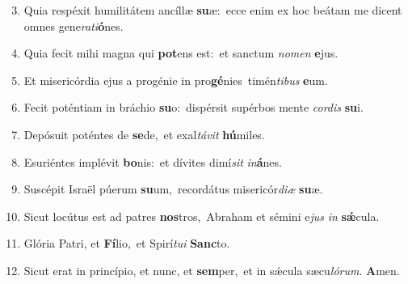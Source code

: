 \begin{enumerate}
    \setcounter{enumi}{2}

    \item Quia respéxit humilitátem ancíllæ \textbf{su}æ:~\redgreheightstar ecce enim ex hoc beátam me dicent omnes gene\textit{ra}\textit{ti}\textbf{ó}nes.

    \item Quia fecit mihi magna qui \textbf{pot}ens est:~\redgreheightstar et sanctum \textit{no}\textit{men} \textbf{e}jus.

    \item Et misericórdia ejus a progénie in pro\textbf{gé}nies~\redgreheightstar timén\textit{ti}\textit{bus} \textbf{e}um.

    \item Fecit poténtiam in bráchio \textbf{su}o:~\redgreheightstar dispérsit supérbos mente \textit{cor}\textit{dis} \textbf{su}i.

    \item Depósuit poténtes de \textbf{se}de,~\redgreheightstar et exal\textit{tá}\textit{vit} \textbf{hú}miles.

    \item Esuriéntes implévit \textbf{bo}nis:~\redgreheightstar et dívites dimí\textit{sit} \textit{in}\textbf{á}nes.

    \item Suscépit Israël púerum \textbf{su}um,~\redgreheightstar recordátus misericór\textit{di}\textit{æ} \textbf{su}æ.

    \item Sicut locútus est ad patres \textbf{nos}tros,~\redgreheightstar Abraham et sémini e\textit{jus} \textit{in} \textbf{sǽ}cula.

    \item Glória Patri, et \textbf{Fí}lio,~\redgreheightstar et Spirí\textit{tu}\textit{i} \textbf{Sanc}to.

    \item Sicut erat in princípio, et nunc, et \textbf{sem}per,~\redgreheightstar et in sǽcula sæcu\textit{ló}\textit{rum}. \textbf{A}men.

\end{enumerate}
